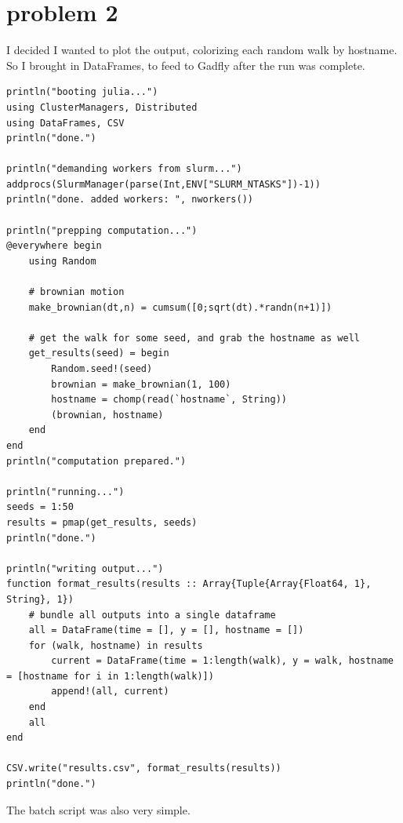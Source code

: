 \documentclass[nobib]{tufte-handout}
\begin{document}
\section{problem 2}
\label{sec:org43f54b0}

I decided I wanted to plot the output, colorizing each random walk by hostname. So I brought in DataFrames, to feed to Gadfly after the run was complete.


\begin{verbatim}
println("booting julia...")
using ClusterManagers, Distributed
using DataFrames, CSV
println("done.")

println("demanding workers from slurm...")
addprocs(SlurmManager(parse(Int,ENV["SLURM_NTASKS"])-1))
println("done. added workers: ", nworkers())

println("prepping computation...")
@everywhere begin
    using Random

    # brownian motion
    make_brownian(dt,n) = cumsum([0;sqrt(dt).*randn(n+1)])

    # get the walk for some seed, and grab the hostname as well
    get_results(seed) = begin
        Random.seed!(seed)
        brownian = make_brownian(1, 100)
        hostname = chomp(read(`hostname`, String))
        (brownian, hostname)
    end
end
println("computation prepared.")

println("running...")
seeds = 1:50
results = pmap(get_results, seeds)
println("done.")

println("writing output...")
function format_results(results :: Array{Tuple{Array{Float64, 1}, String}, 1})
    # bundle all outputs into a single dataframe
    all = DataFrame(time = [], y = [], hostname = [])
    for (walk, hostname) in results
        current = DataFrame(time = 1:length(walk), y = walk, hostname = [hostname for i in 1:length(walk)])
        append!(all, current)
    end
    all
end

CSV.write("results.csv", format_results(results))
println("done.")

\end{verbatim}

The batch script was also very simple.
\end{document}
